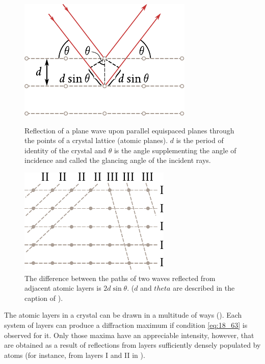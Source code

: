 \begin{figure}[t]
	\begin{minipage}[t]{0.48\linewidth}
		\begin{center}
			\includegraphics[scale=1]{figures/ch_18/fig_18_42.pdf}
            \caption[]{Reflection of a plane wave upon parallel equispaced planes through the points of a crystal lattice (atomic planes). $d$ is the period of identity of the crystal and $\theta$ is the angle supplementing the angle of incidence and called the glancing angle of the incident rays.}
			\label{fig:18_42}
		\end{center}
	\end{minipage}
	\hfill{ }%
	\begin{minipage}[t]{0.48\linewidth}
		\begin{center}
			\includegraphics[scale=1]{figures/ch_18/fig_18_43.pdf}
			\caption[]{The difference between the paths of two waves reflected from adjacent atomic layers is $2d \sin\theta$. ($d$ and $theta$ are described in the caption of ).}
			\label{fig:18_43}
		\end{center}
	\end{minipage}
\vspace{-0.4cm}
\end{figure}

The atomic layers in a crystal can be drawn in a multitude of ways ().
Each system of layers can produce a diffraction maximum if condition \eqref{eq:18_63} is observed for it.
Only those maxima have an appreciable intensity, however, that are obtained as a result of reflections from layers sufficiently densely populated by atoms (for instance, from layers I and II in ).

